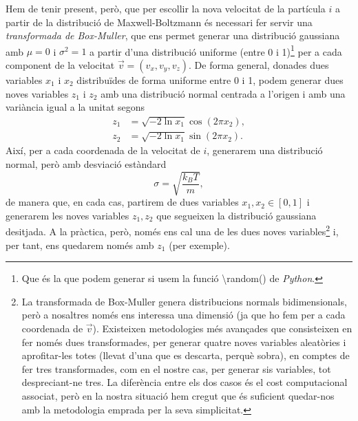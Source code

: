 \documentclass[a4paper,10.5pt]{report}
\begin{document}
\begin{enumerate}
	Hem de tenir present, però, que per escollir la nova velocitat de la partícula $i$ a partir de la distribució de Maxwell-Boltzmann és necessari fer servir una \textit{transformada de Box-Muller}, que ens permet generar una distribució gaussiana amb $\mu = 0$ i $\sigma^2 = 1$ a partir d'una distribució uniforme (entre 0 i 1)\footnote{Que és la que podem generar si usem la funció \textsf{\textbackslash random()} de \textit{Python}.} per a cada component de la velocitat $\vec{v} = (v_x, v_y, v_z)$. De forma general, donades dues variables $x_1$ i $x_2$ distribuïdes de forma uniforme entre 0 i 1, podem generar dues noves variables $z_1$ i $z_2$ amb una distribució normal centrada a l'origen i amb una variància igual a la unitat segons
	\begin{align}
		z_1 &= \sqrt{-2\ln x_1}\cos(2\pi x_2), \label{eq:1.8}\\
		z_2 &= \sqrt{-2\ln x_1}\sin(2\pi x_2). \label{eq:1.9}
	\end{align} 
	Així, per a cada coordenada de la velocitat de $i$, generarem una distribució normal, però amb desviació estàndard 
	\begin{equation}
		\sigma = \sqrt{\frac{k_BT}{m}},
	\end{equation}
	de manera que, en cada cas, partirem de dues variables $x_1,x_2 \in [0,1]$ i generarem les noves variables $z_1,z_2$ que segueixen la distribució gaussiana desitjada. A la pràctica, però, només ens cal una de les dues noves variables\footnote{La transformada de Box-Muller genera distribucions normals bidimensionals, però a nosaltres només ens interessa una dimensió (ja que ho fem per a cada coordenada de $\vec{v}$). Existeixen metodologies més avançades que consisteixen en fer només dues transformades, per generar quatre noves variables aleatòries i aprofitar-les totes (llevat d'una que es descarta, perquè sobra), en comptes de fer tres transformades, com en el nostre cas, per generar sis variables, tot despreciant-ne tres. La diferència entre els dos casos és el cost computacional associat, però en la nostra situació hem cregut que és suficient quedar-nos amb la metodologia emprada per la seva simplicitat.} i, per tant, ens quedarem només amb $z_1$ (per exemple). 
	

\end{enumerate}
\end{document}
